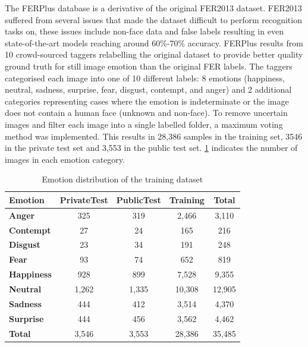 The FERPlus database is a derivative of the original FER2013 dataset. FER2013 suffered from several issues that made the dataset difficult to perform recognition tasks on, these issues include non-face data and false labels resulting in even state-of-the-art models reaching around 60\%-70\% accuracy. FERPlus results from 10 crowd-sourced taggers relabelling the original dataset to provide better quality ground truth for still image emotion than the original FER labels. The taggers categorised each image into one of 10 different labels: 8 emotions (happiness, neutral, sadness, surprise, fear, disgust, contempt, and anger) and 2 additional categories representing cases where the emotion is indeterminate or the image does not contain a human face (unknown and non-face). To remove uncertain images and filter each image into a single labelled folder, a maximum voting method was implemented. This results in 28,386 samples in the training set, 3546 in the private test set and 3,553 in the public test set. \ref{tab:emotion_distribution} indicates the number of images in each emotion category.

\begin{table}[h!]
\centering
\caption{Emotion distribution of the training dataset}
\begin{tabular}{|l|c|c|c|c|}
\hline
\textbf{Emotion}   & \textbf{PrivateTest} & \textbf{PublicTest} & \textbf{Training} & \textbf{Total} \\ \hline
\textbf{Anger}     & 325                  & 319                 & 2,466             & 3,110          \\ \hline
\textbf{Contempt}  & 27                   & 24                  & 165               & 216            \\ \hline
\textbf{Disgust}   & 23                   & 34                  & 191               & 248            \\ \hline
\textbf{Fear}      & 93                   & 74                  & 652               & 819            \\ \hline
\textbf{Happiness} & 928                  & 899                 & 7,528             & 9,355          \\ \hline
\textbf{Neutral}   & 1,262                & 1,335               & 10,308            & 12,905         \\ \hline
\textbf{Sadness}   & 444                  & 412                 & 3,514             & 4,370          \\ \hline
\textbf{Surprise}  & 444                  & 456                 & 3,562             & 4,462          \\ \hline
\textbf{Total}     & 3,546                & 3,553               & 28,386            & 35,485         \\ \hline
\end{tabular}
\label{tab:emotion_distribution}
\end{table}

